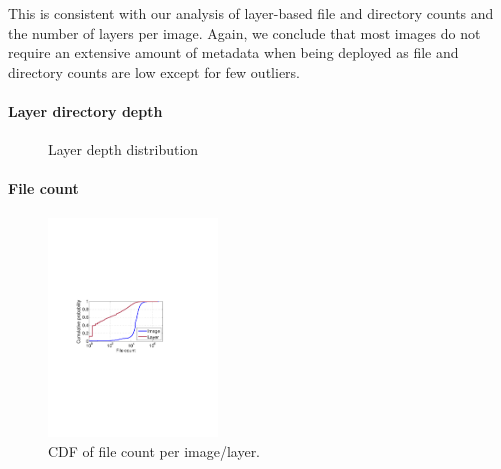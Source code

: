This is consistent with our analysis of layer-based file and directory counts
and the number of layers per image. Again, we conclude that most images do not
require an extensive amount of metadata when being deployed as file and
directory counts are low except for few outliers.

%


\paragraph{Layer directory depth}

\begin{figure}[!t]
	\centering
	\caption{Layer depth distribution}
	\label{fig:reference-cnt}
\end{figure}

\paragraph{File count} 
\begin{figure}
	\centering
	\includegraphics[width=0.4\textwidth]{graphs/file-cnt-cdf.pdf}
	\caption{CDF of file count per image/layer.
	}
	\label{fig:reference-cnt}
\end{figure}

